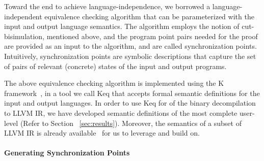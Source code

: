  Toward the end to achieve language-independence, we borrowed a
 language-independent equivalence checking algorithm that can be parameterized
 with the input and output language semantics. The algorithm employs the notion
 of cut-bisimulation, mentioned above, and the program point pairs needed for
 the proof are provided as an input to the algorithm, and are called
 synchronization points. Intuitively, synchronization points are symbolic
 descriptions that capture the set of pairs of relevant (concrete) states of
 the input and output programs.
 
 The above equivalence checking algorithm is implemented using the K
 framework~\cite{k-primer-2013-v32}, in a tool we call Keq that accepts formal
 semantic definitions for the input and output languages. In order to use Keq
 for \TV of the binary decompilation to LLVM IR, we have developed \K semantic
 definitions of the most complete user-level \ISA (Refer to Section
     ~\ref{sec:results}). Moreover, the semantics of a subset of LLVM IR is
 already available~\cite{LLVMSEMA} for us to leverage and build on. 
 
 \paragraph{Generating Synchronization Points}

